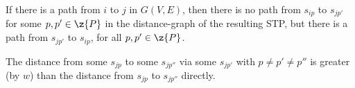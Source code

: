 %
%

If there is a path from $i$ to $j$ in $G(V, E)$,
then there is no path from $s_{ip}$ to $s_{jp'}$ for some $p, p' \in \z{P}$ in the distance-graph of the resulting STP,
but there is a path from $s_{jp'}$ to $s_{ip}$, for all $p, p' \in \z{P}$.

The distance from some $s_{jp}$ to some $s_{jp''}$ via some $s_{jp'}$ with $p\neq p' \neq p''$ is greater (by $w$)
than the distance from $s_{jp}$ to $s_{jp''}$ directly.